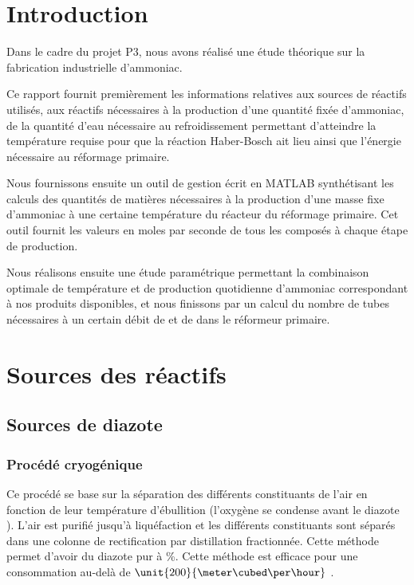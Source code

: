

\section{Introduction}
Dans le cadre du projet P3, nous avons réalisé une 
étude théorique sur la fabrication
industrielle d'ammoniac.

Ce rapport fournit premièrement les informations relatives
aux sources de réactifs utilisés,
aux réactifs nécessaires à la production d'une quantité fixée 
d'ammoniac, de la quantité d'eau nécessaire au refroidissement
permettant d'atteindre la température requise pour que la 
réaction Haber-Bosch ait lieu ainsi que l'énergie nécessaire au 
réformage primaire.

Nous fournissons ensuite un outil de gestion écrit en MATLAB 
synthétisant les calculs des quantités de matières nécessaires 
à la production d'une masse fixe d'ammoniac à une certaine 
température du réacteur du réformage primaire. Cet outil fournit 
les valeurs en moles par seconde de tous les composés à chaque étape de production.

Nous réalisons ensuite une étude paramétrique permettant la combinaison
optimale de température et de production quotidienne 
d'ammoniac correspondant à nos produits disponibles, et nous finissons
par un calcul du nombre de tubes nécessaires à un 
certain débit de  et de  dans le réformeur primaire.

\section{Sources des réactifs}
	\subsection{Sources de diazote}
	\subsubsection{Procédé cryogénique}
	Ce procédé se base sur la séparation des différents constituants de 
	l'air en fonction de leur température 
	d'ébullition (l'oxygène  se condense avant le diazote ).
	L'air est purifié jusqu'à liquéfaction et les différents constituants 
	sont séparés dans une colonne de 
	rectification par distillation fractionnée. Cette méthode permet d'avoir
	du diazote  pur 
	à \%. Cette méthode est efficace pour une consommation
	au-delà de $\unit{200}{\meter\cubed\per\hour}$ \cite{scf}. 

